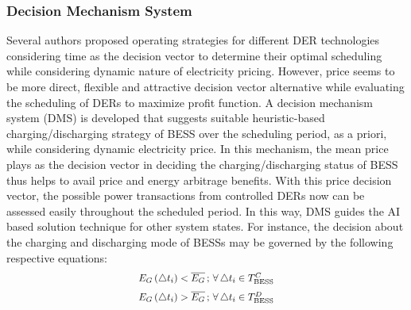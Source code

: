 \documentclass[journal]{IEEEtran}
\newcommand*\Laplace{\mathop{}\!\mathbin\bigtriangleup}
\begin{document}
\subsubsection{Decision Mechanism System }\label{section:decision mechanism}
Several authors \cite{1300713,7973037,7879188,6652316, 6695368,7339477,7973220,6662462,6305498} proposed operating strategies for different DER technologies considering time as the decision vector to determine their optimal scheduling while considering dynamic nature of electricity pricing. However, price seems to be more direct, flexible and attractive decision vector alternative while evaluating the scheduling of DERs to maximize profit function. A decision mechanism system (DMS) is developed that suggests suitable heuristic-based charging/discharging strategy of BESS over the scheduling period, as a priori, while considering dynamic electricity price. In this mechanism, the mean price plays as the decision vector in deciding the charging/discharging status of BESS thus helps to avail price and energy arbitrage benefits. With this price decision vector, the possible power transactions from controlled DERs now can be assessed easily throughout the scheduled period. In this way, DMS guides the AI based solution technique for other system states. For instance, the decision about the charging and discharging mode of BESSs may be governed by the following respective equations:\vspace{-0.2cm}
	\begin{equation}
		\scalebox{0.9}[0.9]{$
	{{E}_{G}}\left( \Laplace {{t}_{i}} \right)<\overline{{{E}_{G}}}\,;\,\forall \Laplace {{t}_{i}}\in T_{\text{BESS}}^{C}
	$}
	\label{eqn1}
	\end{equation}
	\begin{equation}
	\scalebox{0.9}[0.9]{$
	{{E}_{G}}\left( \Laplace {{t}_{i}} \right)>\overline{{{E}_{G}}}\,;\,\forall \Laplace {{t}_{i}}\in T_{\text{BESS}}^{D}
	$}
	\label{eqn2}
	\end{equation}
\end{document}
